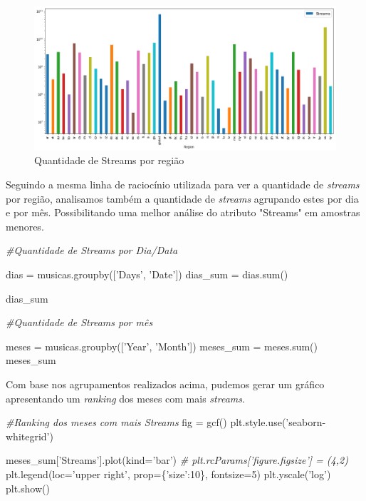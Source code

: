 \documentclass[11pt]{article}
\makeatletter
\def\maxwidth{\ifdim\Gin@nat@width>\linewidth\linewidth
    \else\Gin@nat@width\fi}
\let\Oldincludegraphics\includegraphics
\renewcommand{\includegraphics}[1]{\Oldincludegraphics[width=.8\maxwidth]{#1}}
\newenvironment{Shaded}{}{}
\newcommand{\DecValTok}[1]{\textcolor[rgb]{0.25,0.63,0.44}{{#1}}}
\newcommand{\StringTok}[1]{\textcolor[rgb]{0.25,0.44,0.63}{{#1}}}
\newcommand{\CommentTok}[1]{\textcolor[rgb]{0.38,0.63,0.69}{\textit{{#1}}}}
\newcommand{\NormalTok}[1]{{#1}}
\newcommand{\OperatorTok}[1]{\textcolor[rgb]{0.40,0.40,0.40}{{#1}}}
\newcommand{\BuiltInTok}[1]{{#1}}
\makeatother
\begin{document}
\begin{figure}
\centering
\includegraphics{output_8_0.png}
\caption{Quantidade de Streams por região}
\end{figure}

    Seguindo a mesma linha de raciocínio utilizada para ver a quantidade de
\emph{streams} por região, analisamos também a quantidade de
\emph{streams} agrupando estes por dia e por mês. Possibilitando uma
melhor análise do atributo "Streams" em amostras menores.

    \begin{Shaded}
\begin{Highlighting}[]
    \CommentTok{#Quantidade de Streams por Dia/Data}

\NormalTok{dias }\OperatorTok{=}\NormalTok{ musicas.groupby([}\StringTok{'Days'}\NormalTok{, }\StringTok{'Date'}\NormalTok{])}
\NormalTok{dias_sum }\OperatorTok{=}\NormalTok{ dias.}\BuiltInTok{sum}\NormalTok{()}

\NormalTok{dias_sum}

    \CommentTok{#Quantidade de Streams por mês}

\NormalTok{meses }\OperatorTok{=}\NormalTok{ musicas.groupby([}\StringTok{'Year'}\NormalTok{, }\StringTok{'Month'}\NormalTok{])}
\NormalTok{meses_sum }\OperatorTok{=}\NormalTok{ meses.}\BuiltInTok{sum}\NormalTok{()}
\NormalTok{meses_sum}
\end{Highlighting}
\end{Shaded}

    Com base nos agrupamentos realizados acima, pudemos gerar um gráfico
apresentando um \emph{ranking} dos meses com mais \emph{streams}.

    \begin{Shaded}
\begin{Highlighting}[]
    \CommentTok{#Ranking dos meses com mais Streams}
\NormalTok{    fig }\OperatorTok{=}\NormalTok{ gcf()}
\NormalTok{    plt.style.use(}\StringTok{'seaborn-whitegrid'}\NormalTok{)}

\NormalTok{    meses_sum[}\StringTok{'Streams'}\NormalTok{].plot(kind}\OperatorTok{=}\StringTok{'bar'}\NormalTok{)}
    \CommentTok{# plt.rcParams['figure.figsize'] = (4,2)}
\NormalTok{    plt.legend(loc}\OperatorTok{=}\StringTok{'upper right'}\NormalTok{, prop}\OperatorTok{=}\NormalTok{\{}\StringTok{'size'}\NormalTok{:}\DecValTok{10}\NormalTok{\}, fontsize}\OperatorTok{=}\DecValTok{5}\NormalTok{)}
\NormalTok{    plt.yscale(}\StringTok{'log'}\NormalTok{)}
\NormalTok{    plt.show()}
\end{Highlighting}
\end{Shaded}
\end{document}
